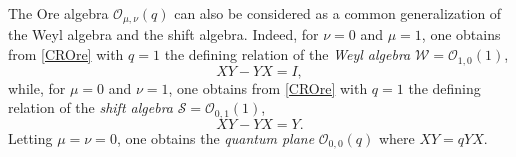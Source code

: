 \documentclass[10pt]{amsart}
\begin{document}
The Ore algebra ${\mathcal O}_{\mu,\nu}(q)$ can also be considered as a common generalization of the Weyl algebra and the shift algebra. Indeed, for $\nu =0$ and $\mu=1$, one obtains from \eqref{CROre} with $q=1$ the defining relation of the {\em Weyl algebra} ${\mathcal W}={\mathcal O}_{1,0}(1)$,
\begin{equation}\label{CRWeyl}
XY-YX=I,
\end{equation}
while, for $\mu =0$ and $\nu=1$, one obtains from \eqref{CROre} with $q=1$ the defining relation of the {\em shift algebra} ${\mathcal S}={\mathcal O}_{0,1}(1)$,
\begin{equation}\label{CRShift}
XY-YX=Y.
\end{equation}
Letting $\mu =\nu=0$, one obtains the {\em quantum plane} ${\mathcal O}_{0,0}(q)$ where $XY=qYX$.
\end{document}
